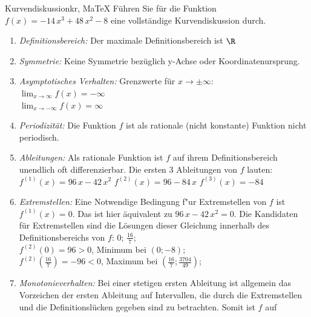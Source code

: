  \providecommand{\MoIl}{(} 
 \providecommand{\MoIr}{)}
 \providecommand{\MIntvlSep}{;} 
 \providecommand{\MElSetSep}{;} 
 \begin{MAufgabe}{Kurvendiskussion}{kr, MaTeX}
 F\"uhren Sie f\"ur die Funktion $f(x)= - 14\, x^3 + 48\, x^2 - 8$ eine vollst\"andige Kurvendiskussion durch.\\ 
 \ifLsg\Loesung
 \begin{enumerate}
 \item \emph{Definitionsbereich:} 
 Der maximale Definitionsbereich ist $\R$\item \emph{Symmetrie:} 
 Keine Symmetrie bez\"uglich y-Achse oder Koordinatenursprung.\item \emph{Asymptotisches Verhalten:} 
 Grenzwerte f\"ur $x\rightarrow \pm \infty$: \\ 
 $\lim_{x\rightarrow \infty} f(x)=- \infty$ \\ 
 $\lim_{x\rightarrow -\infty} f(x)=\infty$ \\ 
 \item \emph{Periodizit\"at:} 
 Die Funktion $f$ ist als rationale (nicht konstante) Funktion nicht periodisch.\item \emph{Ableitungen:} 
 Als rationale Funktion ist $f$ auf ihrem Definitionsbereich unendlich oft differenzierbar. 
 Die ersten 3 Ableitungen von $f$ lauten: \\ 
 $f^{(1)}(x)=96\, x - 42\, x^2$\newline 
  $f^{(2)}(x)=96 - 84\, x$\newline 
  $f^{(3)}(x)=-84$\newline 
  \item \emph{Extremstellen:} 
 Eine Notwendige Bedingung f"ur Extremstellen von $f$ ist $f^{(1)}(x)=0$. 
 Das ist hier \"aquivalent zu $96\, x - 42\, x^2=0$. 
 Die Kandidaten f\"ur Extremstellen sind die L\"osungen dieser Gleichung innerhalb des Definitionsbereichs von $f$: $0$; $\frac{16}{7}$; \\ 
 $f^{(2)}(0)=96$$>0$, Minimum bei $(0;-8)$; \\ 
 $f^{(2)}(\frac{16}{7})=-96$$<0$, Maximum bei $(\frac{16}{7};\frac{3704}{49})$; \\ 
 \item \emph{Monotonieverhalten:} 
 Bei einer stetigen ersten Ableitung ist allgemein das Vorzeichen der ersten Ableitung auf Intervallen, die durch die Extremstellen und die Definitionsl\"ucken gegeben sind zu betrachten. Somit ist $f$ auf \\ 

\end{enumerate}
\end{MAufgabe}
